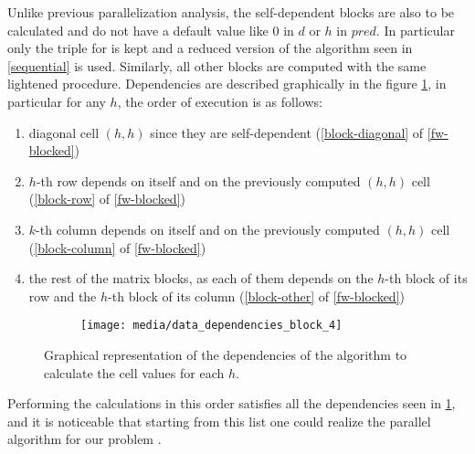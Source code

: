 Unlike previous parallelization analysis, the self-dependent blocks are also to be calculated and do not have a default value like \(0\) in \(d\) or \(h\) in \(pred\). 
In particular only the triple for is kept and a reduced version of the algorithm seen in \cref{sequential} is used.
Similarly, all other blocks are computed with the same lightened procedure. Dependencies are described graphically in the figure \cref{data-dependency-external-loop-parallel}, in particular for any \(h\), the order of execution is as follows:

\begin{enumerate}
    \item diagonal cell \((h,h)\) since they are self-dependent (\cref{block-diagonal} of \cref{fw-blocked})
    \item \(h\)-th row depends on itself and on the previously computed  \((h,h)\) cell (\cref{block-row}  of \cref{fw-blocked})
    \item \(k\)-th column depends on itself and on the previously computed  \((h,h)\) cell (\cref{block-column}  of \cref{fw-blocked})
    \item the rest of the matrix blocks, as each of them depends on the \(h\)-th block of its row and the \(h\)-th block of its column (\cref{block-other}  of \cref{fw-blocked})
\end{enumerate}


\begin{figure}[htbp]
    \centering
    \begin{subfigure}[t]{0.8\textwidth}
        \centering
        \texttt{[image: media/data\_dependencies\_block\_4]}
    \end{subfigure}

    \caption{Graphical representation of the dependencies of the algorithm to calculate the cell values for each \(h\).}
    \label{data-dependency-external-loop-parallel}
\end{figure}

Performing the calculations in this order satisfies all the dependencies seen in \cref{data-dependency-external-loop-parallel}, and it is noticeable that starting from this list one could realize the parallel algorithm for our problem \cite{rucci}.

